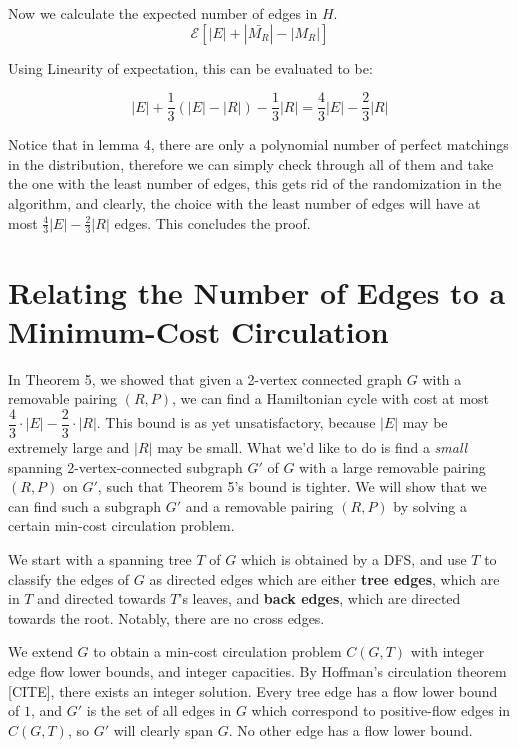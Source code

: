 \documentclass[12pt]{article}
\begin{document}
Now we calculate the expected number of edges in $H$.
\begin{equation}
\mathcal{E}[|E|+|\bar{M_R}|-|M_R|]
\end{equation}

Using Linearity of expectation, this can be evaluated to be:

\begin{equation}
|E| + \frac{1}{3}(|E|-|R|)-\frac{1}{3}|R| = \frac{4}{3}|E|-\frac{2}{3}|R|
\end{equation}

Notice that in lemma 4, there are only a polynomial number of perfect matchings in the distribution, therefore we can simply check through all of them and take the one with the least number of edges, this gets rid of the randomization in the algorithm, and clearly, the choice with the least number of edges will have at most $\frac{4}{3}|E|-\frac{2}{3}|R|$ edges. This concludes the proof.


\section{Relating the Number of Edges to a Minimum-Cost Circulation}

In Theorem 5, we showed that given a 2-vertex connected graph $G$ with a
removable pairing $(R, P)$, we can find a Hamiltonian cycle with cost at most
$\dfrac{4}{3} \cdot |E| - \dfrac{2}{3} \cdot |R|$.  This bound is as yet
unsatisfactory, because $|E|$ may be extremely large and $|R|$ may be small.
What we'd like to do is find a \emph{small} spanning 2-vertex-connected
subgraph $G'$ of $G$ with a large removable pairing $(R, P)$ on $G'$, such that
Theorem 5's bound is tighter.  We will show that we can find such a subgraph
$G'$ and a removable pairing $(R,P)$ by solving a certain min-cost circulation
problem.

We start with a spanning tree $T$ of $G$ which is obtained by a DFS, and use
$T$ to classify the edges of $G$ as directed edges which are either {\bf tree
edges}, which are in $T$ and directed towards $T$'s leaves, and {\bf back
edges}, which are directed towards the root.  Notably, there are no cross edges.

We extend $G$ to obtain a min-cost circulation problem $C(G, T)$ with integer
edge flow lower bounds, and integer capacities.  By Hoffman's circulation
theorem [CITE], there exists an integer solution. Every tree edge has a
flow lower bound of $1$, and $G'$ is the set of all edges in $G$ which
correspond to positive-flow edges in $C(G,T)$, so $G'$ will clearly span $G$.
No other edge has a flow lower bound.  
\end{document}
